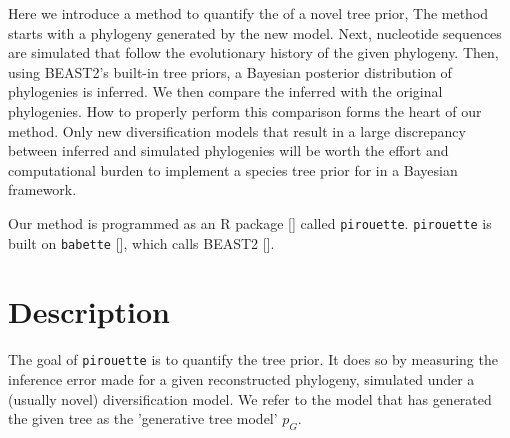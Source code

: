 Here we introduce a method to quantify the  
of a novel tree prior,
The method starts with a phylogeny generated by the new model. 
Next, nucleotide sequences are simulated that follow the evolutionary 
history of the given phylogeny. 
Then, using BEAST2's built-in tree priors,
a Bayesian posterior distribution of phylogenies is inferred. 
We then compare the inferred with the original phylogenies. 
How to properly perform this comparison forms the heart of our method.
Only new diversification models that result 
in a large discrepancy between inferred and simulated phylogenies 
will be worth the effort and computational burden to implement 
a species tree prior for in a Bayesian framework.

Our method is programmed as an R package [\cite{R}] called \verb;pirouette;.
\verb;pirouette; is built on \verb;babette; [\cite{bilderbeek2018babette}], 
which calls BEAST2 [\cite{bouckaert2019beast}]. 

\section{Description}

The goal of \verb;pirouette; is to quantify the  tree prior.
It does so by measuring the inference error made 
for a given reconstructed phylogeny, 
simulated under a (usually novel) diversification model.
We refer to the model that has generated the given tree 
as the 'generative tree model' $\mathit{p_{G}}$.

